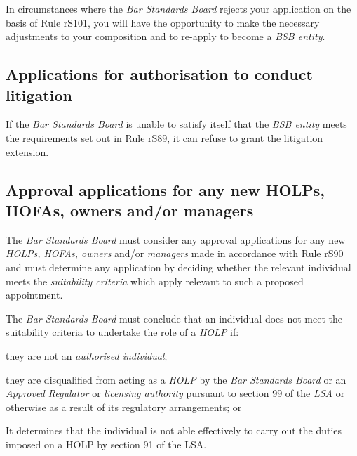 


In circumstances where the \emph{Bar Standards Board} rejects your
application on the basis of Rule rS101, you will have the opportunity to
make the necessary adjustments to your composition and to re-apply to
become a \emph{BSB entity}.



\subsection{Applications for authorisation to conduct litigation}


If the \emph{Bar Standards Board} is unable to satisfy itself that the
\emph{BSB entity} meets the requirements set out in Rule rS89, it can
refuse to grant the litigation extension.

\subsection{Approval applications for any new HOLPs, HOFAs, owners and/or
managers}


The \emph{Bar Standards Board} must consider any approval applications
for any new \emph{HOLPs, HOFAs, owners} and/or \emph{managers} made in
accordance with Rule rS90 and must determine any application by deciding
whether the relevant individual meets the \emph{suitability criteria}
which apply relevant to such a proposed appointment.




The \emph{Bar Standards Board} must conclude that an individual does not
meet the suitability criteria to undertake the role of a \emph{HOLP} if:\nl\item they are not an \emph{authorised individual};
\item they are disqualified from acting as a \emph{HOLP} by the \emph{Bar
Standards Board} or an \emph{Approved Regulator} or \emph{licensing
authority} pursuant to section 99 of the \emph{LSA} or otherwise as a
result of its regulatory arrangements; or
\item It determines that the individual is not able effectively to carry
out the duties imposed on a HOLP by section 91 of the LSA.
\ln
{}

